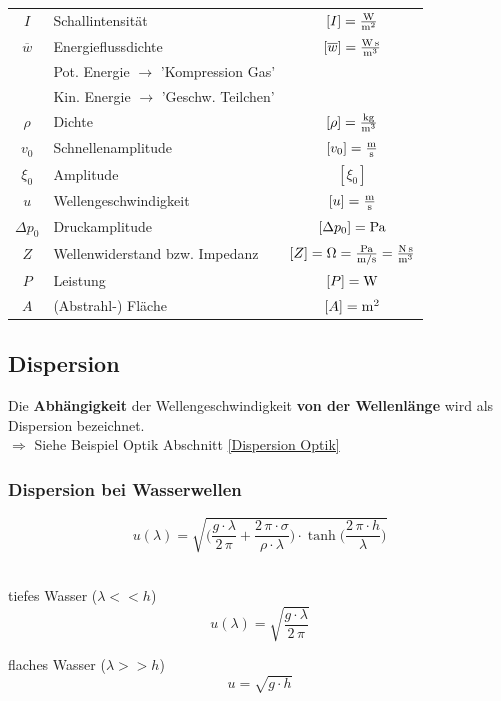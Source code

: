 \renewcommand{\arraystretch}{1.1}
\begin{tabular}{clc}
$I$ &  Schallintensität & $[I] = \frac{\mathrm{W}}{\mathrm{m}^2}$ \\
$\overline{w}$ & Energieflussdichte & $[\overline{w}] = \frac{\mathrm{W} \, \mathrm{s}}{\mathrm{m}^3}$ \\
 & Pot. Energie $\rightarrow$ 'Kompression Gas'& \\
 & Kin. Energie $\rightarrow$ 'Geschw. Teilchen'& \\
$\rho$ & Dichte & $[\rho] = \frac{\mathrm{kg}}{\mathrm{m}^3}$ \\
$v_0$ & Schnellenamplitude & $[v_0] = \frac{\mathrm{m}}{\mathrm{s}}$ \\
$\xi_0$ & Amplitude & $[\xi_0]$ \\
$u$ & Wellengeschwindigkeit & $[u] = \frac{\mathrm{m}}{\mathrm{s}}$ \\
$\Delta p_0$ & Druckamplitude & $[\Delta p_0] = \mathrm{Pa}$ \\
$Z$ & Wellenwiderstand bzw. Impedanz & $[Z] = \mathrm{\Omega} = \frac{\mathrm{Pa}}{\mathrm{m} / \mathrm{s}} = \frac{\mathrm{N} \, \mathrm{s}}{\mathrm{m}^3}$ \\
$P$ & Leistung & $[P] = \mathrm{W}$ \\
$A$ & (Abstrahl-) Fläche & $[A] = \mathrm{m}^2$ 
\end{tabular}
\renewcommand{\arraystretch}{1}



\subsection{Dispersion}
Die \textbf{Abhängigkeit} der Wellengeschwindigkeit \textbf{von der Wellenlänge} wird als Dispersion bezeichnet. \\
\vspace{0.2cm}
$\Rightarrow$ Siehe Beispiel Optik Abschnitt \ref{Dispersion Optik}

\subsubsection{Dispersion bei Wasserwellen}

$$ \boxed{ u(\lambda) = \sqrt{\Big( \frac{g \cdot \lambda}{2 \, \pi} + \frac{2 \, \pi \cdot \sigma}{\rho \cdot 
\lambda} \Big) \cdot \tanh \Big( \frac{2 \, \pi \cdot h}{\lambda} \Big) }  } $$ \\


\begin{minipage}{0.48\linewidth}
tiefes Wasser ($\lambda << h$)
$$ \boxed{ u(\lambda) = \sqrt{\frac{g \cdot \lambda}{2 \, \pi}} } $$
\end{minipage}
\hfill
\begin{minipage}{0.48\linewidth}
flaches Wasser ($\lambda >> h$)
$$ \boxed{ u = \sqrt{ g \cdot h } } $$
\end{minipage}

